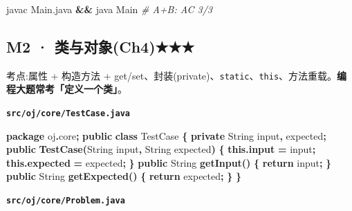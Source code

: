 \documentclass[
  11pt,
]{ctexart}
\newenvironment{Shaded}{\begin{snugshade}}{\end{snugshade}}
\newcommand{\BuiltInTok}[1]{#1}
\newcommand{\CommentTok}[1]{\textcolor[rgb]{0.56,0.35,0.01}{\textit{#1}}}
\newcommand{\ControlFlowTok}[1]{\textcolor[rgb]{0.13,0.29,0.53}{\textbf{#1}}}
\newcommand{\ExtensionTok}[1]{#1}
\newcommand{\FunctionTok}[1]{\textcolor[rgb]{0.13,0.29,0.53}{\textbf{#1}}}
\newcommand{\ImportTok}[1]{#1}
\newcommand{\KeywordTok}[1]{\textcolor[rgb]{0.13,0.29,0.53}{\textbf{#1}}}
\newcommand{\NormalTok}[1]{#1}
\newcommand{\OperatorTok}[1]{\textcolor[rgb]{0.81,0.36,0.00}{\textbf{#1}}}
\begin{document}
\begin{Shaded}
\begin{Highlighting}[]
\ExtensionTok{javac}\NormalTok{ Main.java }\KeywordTok{\&\&} \ExtensionTok{java}\NormalTok{ Main      }\CommentTok{\# A+B: AC 3/3}
\end{Highlighting}
\end{Shaded}

\hypertarget{m2-ux7c7bux4e0eux5bf9ux8c61ch4}{%
\subsection{M2 ·
类与对象(Ch4)★★★}\label{m2-ux7c7bux4e0eux5bf9ux8c61ch4}}

考点:属性 + 构造方法 +
get/set、封装(private)、\texttt{static}、\texttt{this}、方法重载。\textbf{编程大题常考「定义一个类」}。

\textbf{\texttt{src/oj/core/TestCase.java}}

\begin{Shaded}
\begin{Highlighting}[]
\KeywordTok{package}\ImportTok{ oj}\OperatorTok{.}\ImportTok{core}\OperatorTok{;}
\KeywordTok{public} \KeywordTok{class}\NormalTok{ TestCase }\OperatorTok{\{}
    \KeywordTok{private} \BuiltInTok{String}\NormalTok{ input}\OperatorTok{,}\NormalTok{ expected}\OperatorTok{;}
    \KeywordTok{public} \FunctionTok{TestCase}\OperatorTok{(}\BuiltInTok{String}\NormalTok{ input}\OperatorTok{,} \BuiltInTok{String}\NormalTok{ expected}\OperatorTok{)} \OperatorTok{\{} \KeywordTok{this}\OperatorTok{.}\FunctionTok{input} \OperatorTok{=}\NormalTok{ input}\OperatorTok{;} \KeywordTok{this}\OperatorTok{.}\FunctionTok{expected} \OperatorTok{=}\NormalTok{ expected}\OperatorTok{;} \OperatorTok{\}}
    \KeywordTok{public} \BuiltInTok{String} \FunctionTok{getInput}\OperatorTok{()}    \OperatorTok{\{} \ControlFlowTok{return}\NormalTok{ input}\OperatorTok{;} \OperatorTok{\}}
    \KeywordTok{public} \BuiltInTok{String} \FunctionTok{getExpected}\OperatorTok{()} \OperatorTok{\{} \ControlFlowTok{return}\NormalTok{ expected}\OperatorTok{;} \OperatorTok{\}}
\OperatorTok{\}}
\end{Highlighting}
\end{Shaded}

\textbf{\texttt{src/oj/core/Problem.java}}
\end{document}
